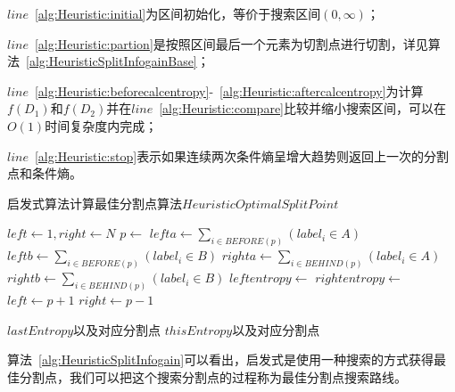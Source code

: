 $line$~\ref{alg:Heuristic:initial}为区间初始化，等价于搜索区间$(0,\infty)$；

$line$~\ref{alg:Heuristic:partion}是按照区间最后一个元素为切割点进行切割，详见算法~\ref{alg:HeuristicSplitInfogainBase}；

$line$~\ref{alg:Heuristic:beforecalcentropy}-~\ref{alg:Heuristic:aftercalcentropy}为计算$f(D_1)$和$f(D_2)$并在$line$~\ref{alg:Heuristic:compare}比较并缩小搜索区间，可以在$O(1)$时间复杂度内完成；

$line$~\ref{alg:Heuristic:stop}表示如果连续两次条件熵呈增大趋势则返回上一次的分割点和条件熵。

\begin{breakablealgorithm}
	\caption{启发式算法计算最佳分割点算法$HeuristicOptimalSplitPoint$}
	\label{alg:HeuristicSplitInfogain}
	\begin{algorithmic}[1]
			\State $left \gets 1,right \gets N$  \label{alg:Heuristic:initial}
				\State $p \gets $   \label{alg:Heuristic:partion}
				\State $lefta \gets \sum_{i\in BEFORE(p)}(label_i\in A)$ \label{alg:Heuristic:beforecalcentropy}
				\State $leftb \gets \sum_{i\in BEFORE(p)}(label_i\in B)$
				\State $righta \gets  \sum_{i \in BEHIND(p)}(label_i \in A)$
				\State $rightb \gets  \sum_{i \in BEHIND(p)}(label_i \in B)$
				\State $leftentropy \gets $ 
				\State $rightentropy \gets $  \label{alg:Heuristic:aftercalcentropy}
				  \label{alg:Heuristic:compare}
					\State $left \gets p+1$
				\Else
					\State $right \gets p-1$
				\EndIf
				
				  \label{alg:Heuristic:stop}
					\State \Return $lastEntropy$以及对应分割点
				\EndIf
			\EndWhile
			\State \Return $thisEntropy$以及对应分割点
		\EndFunction
	\end{algorithmic}
\end{breakablealgorithm}

算法~\ref{alg:HeuristicSplitInfogain}可以看出，启发式是使用一种搜索的方式获得最佳分割点，我们可以把这个搜索分割点的过程称为最佳分割点搜索路线。

